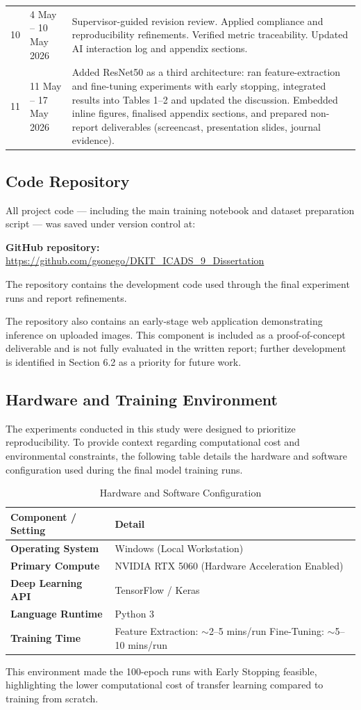 \documentclass[12pt, a4paper]{article}
\begin{document}
\begin{longtable}{@{}lp{3.5cm}p{9.5cm}@{}}
  10 & 4 May -- 10 May 2026  & Supervisor-guided revision review. Applied compliance and reproducibility refinements. Verified metric traceability. Updated AI interaction log and appendix sections. \\[4pt]
  11 & 11 May -- 17 May 2026 & Added ResNet50 as a third architecture: ran feature-extraction and fine-tuning experiments with early stopping, integrated results into Tables 1--2 and updated the discussion. Embedded inline figures, finalised appendix sections, and prepared non-report deliverables (screencast, presentation slides, journal evidence). \\
\end{longtable}

\subsection{Code Repository}

All project code --- including the main training notebook and dataset preparation script --- was saved under version control at:

\textbf{GitHub repository:} \url{https://github.com/gsonego/DKIT_ICADS_9_Dissertation}

The repository contains the development code used through the final experiment runs and report refinements.

The repository also contains an early-stage web application demonstrating inference on uploaded images. This component is included as a proof-of-concept deliverable and is not fully evaluated in the written report; further development is identified in Section 6.2 as a priority for future work.

\subsection{Hardware and Training Environment}

The experiments conducted in this study were designed to prioritize reproducibility. To provide context regarding computational cost and environmental constraints, the following table details the hardware and software configuration used during the final model training runs.

\begin{table}[htbp]
  \centering
  \caption{Hardware and Software Configuration}
  \begin{tabular}{p{4.5cm}p{9.5cm}}
    \toprule
    Component / Setting   & Detail \\
    \midrule
    \textbf{Operating System}  & Windows (Local Workstation) \\
    \textbf{Primary Compute}   & NVIDIA RTX 5060 (Hardware Acceleration Enabled) \\
    \textbf{Deep Learning API} & TensorFlow / Keras \\
    \textbf{Language Runtime}  & Python 3 \\
    \textbf{Training Time}     & Feature Extraction: ${\sim}$2--5 mins/run \textbar{} Fine-Tuning: ${\sim}$5--10 mins/run \\
    \bottomrule
  \end{tabular}
\end{table}

This environment made the 100-epoch runs with Early Stopping feasible, highlighting the lower computational cost of transfer learning compared to training from scratch.
\end{document}

